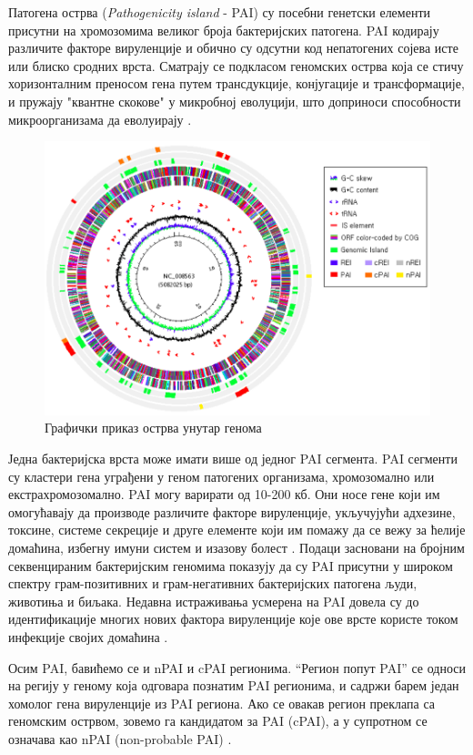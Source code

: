 \documentclass[12pt]{article}
\begin{document}
Патогена острва (\textit{Pathogenicity island} - PAI) су посебни генетски елементи присутни на хромозомима великог броја бактеријских патогена. PAI кодирају различите факторе вируленције и обично су одсутни код непатогених сојева исте или блиско сродних врста. Сматрају се подкласом геномских острва која се стичу хоризонталним преносом гена путем трансдукције, конјугације и трансформације, и пружају "квантне скокове" у микробној еволуцији, што доприноси способности микроорганизама да еволуирају \cite{Gal-Mor2006-dv}. 

\begin{figure}[htbp]
    \centering
    \vspace{0.2cm}
    \includegraphics[width=0.6\linewidth]{images/paidb.png}
    \caption{Графички приказ острва унутар генома}
    \vspace{0.5cm}
    \label{fig:islands}
\end{figure}

Једна бактеријска врста може имати више од једног PAI сегмента. PAI сегменти су кластери гена уграђени у геном патогених организама, хромозомално или екстрахромозомално. PAI могу варирати од 10-200 кб. Они носе гене који им омогућавају да производе различите факторе вируленције, укључујући адхезине, токсине, системе секреције и друге елементе који им помажу да се вежу за ћелије домаћина, избегну имуни систем и изазову болест \cite{Schmidt2004-xj}. Подаци засновани на бројним секвенцираним бактеријским геномима показују да су PAI присутни у широком спектру грам-позитивних и грам-негативних бактеријских патогена људи, животиња и биљака. Недавна истраживања усмерена на PAI довела су до идентификације многих нових фактора вируленције које ове врсте користе током инфекције својих домаћина \cite{Gal-Mor2006-dv}.

Осим PAI, бавићемо се и nPAI и cPAI регионима. ``Регион попут PAI'' се односи на регију у геному која одговара познатим PAI регионима, и садржи барем један хомолог гена вируленције из PAI региона. Ако се овакав регион преклапа са геномским острвом, зовемо га кандидатом за PAI (cPAI), а у супротном се означава као nPAI (non-probable PAI) \cite{Yoon2014-xa}.
\end{document}

